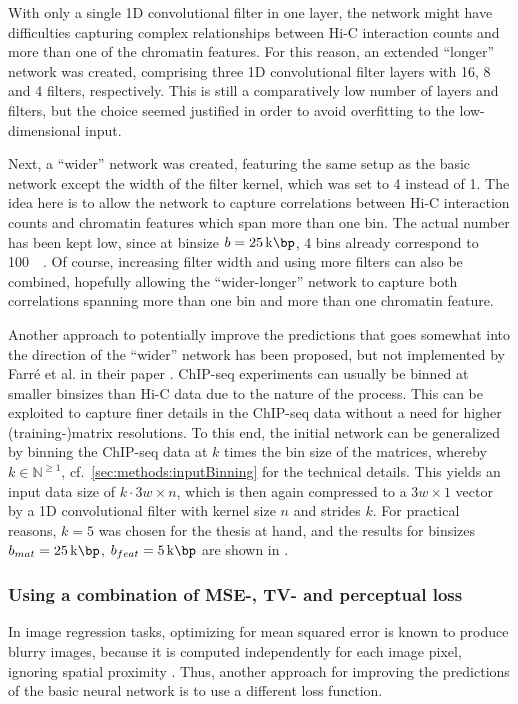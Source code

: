 With only a single 1D convolutional filter in one layer, the network might have difficulties capturing complex relationships 
between Hi-C interaction counts and more than one of the chromatin features.
For this reason, an extended ``longer'' network was created, 
comprising three 1D convolutional filter layers with 16, 8 and 4 filters, respectively.
This is still a comparatively low number of layers and filters,
but the choice seemed justified in order to avoid overfitting to the low-dimensional input.

Next, a ``wider'' network was created, featuring the same setup as the basic network
except the width of the filter kernel, which was set to 4 instead of 1.
The idea here is to allow the network to capture correlations between Hi-C interaction counts
and chromatin features which span more than one bin. 
The actual number has been kept low, since at binsize $b=\SI{25}{\kilo\bp}$, 4 bins already correspond to \SI{100}{\kilo\bp}.
Of course, increasing filter width and using more filters can also be combined,
hopefully allowing the  ``wider-longer'' network to capture both correlations
spanning more than one bin and more than one chromatin feature.

Another approach to potentially improve the predictions that goes somewhat into
the direction of the ``wider'' network has been proposed, but not implemented by Farr\'e et al. 
in their paper \cite{Farre2018a}.
ChIP-seq experiments can usually be binned at smaller binsizes than Hi-C data due to the nature of 
the process. 
This can be exploited to capture finer details in the ChIP-seq data without a need for higher (training-)matrix resolutions.
To this end, the initial network can be generalized by binning the ChIP-seq data at $k$ times the bin size of the matrices, 
whereby $k \in \mathbb{N}^{\geq1}$, cf.~\cref{sec:methods:inputBinning} for the technical details.
This yields an input data size of $k \cdot 3w \times n$, which is then again compressed to a $3w \times 1$ vector 
by a 1D convolutional filter with kernel size $n$ and strides $k$. 
For practical reasons, $k=5$ was chosen for the thesis at hand, 
and the results for binsizes $b_{mat}=\SI{25}{\kilo\bp}$, $b_{feat}=\SI{5}{\kilo\bp}$ are shown in \xxx.


\subsubsection{Using a combination of MSE-, TV- and perceptual loss} \label{sec:improve:combined_loss}
In image regression tasks, optimizing for mean squared error is known to produce blurry images,
because it is computed independently for each image pixel, ignoring spatial proximity \cite{Isola2017,Lu2019}.
Thus, another approach for improving the predictions of the basic neural network is to use a different loss function.

